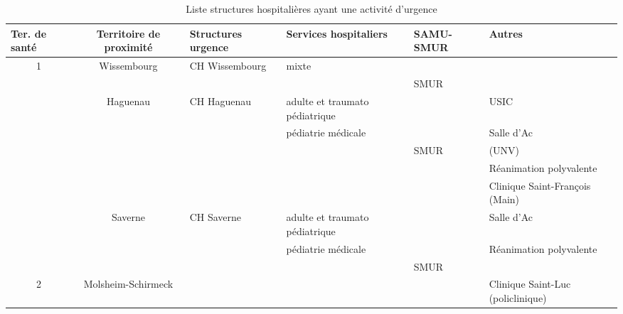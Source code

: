 \documentclass[a4paper,8pt]{article}
\title{}
\author{}
\begin{document}
\maketitle

\section{}

\begin{table}[htbp]
\caption{Liste structures hospitalières ayant une activité d'urgence}
\begin{turn}{90}
\begin{tabular}{|l|c|l|l|l|l|}
\hline
\textbf{Ter. de santé} & \textbf{Territoire de proximité} & \textbf{Structures urgence} & \textbf{Services hospitaliers} & \textbf{SAMU-SMUR} & \textbf{Autres} \\ \hline
\multicolumn{ 1}{|c|}{1} & \multicolumn{ 1}{c|}{Wissembourg} & \multicolumn{ 1}{l|}{CH Wissembourg} & mixte &  &  \\ \cline{ 4- 6}
\multicolumn{ 1}{|l|}{} & \multicolumn{ 1}{c|}{} & \multicolumn{ 1}{l|}{} &  & SMUR &  \\ \cline{ 2- 6}
\multicolumn{ 1}{|l|}{} & \multicolumn{ 1}{c|}{Haguenau} & \multicolumn{ 1}{l|}{CH Haguenau} & adulte et traumato pédiatrique &  & USIC \\ \cline{ 4- 6}
\multicolumn{ 1}{|l|}{} & \multicolumn{ 1}{c|}{} & \multicolumn{ 1}{l|}{} & pédiatrie médicale &  & Salle d'Ac \\ \cline{ 4- 6}
\multicolumn{ 1}{|l|}{} & \multicolumn{ 1}{c|}{} & \multicolumn{ 1}{l|}{} &  & SMUR & (UNV) \\ \cline{ 4- 6}
\multicolumn{ 1}{|l|}{} & \multicolumn{ 1}{c|}{} & \multicolumn{ 1}{l|}{} &  &  & Réanimation polyvalente \\ \cline{ 3- 6}
\multicolumn{ 1}{|l|}{} & \multicolumn{ 1}{c|}{} &  &  &  & Clinique Saint-François (Main) \\ \cline{ 2- 6}
\multicolumn{ 1}{|l|}{} & \multicolumn{ 1}{c|}{Saverne} & \multicolumn{ 1}{l|}{CH Saverne} & adulte et traumato pédiatrique &  & Salle d'Ac \\ \cline{ 4- 6}
\multicolumn{ 1}{|l|}{} & \multicolumn{ 1}{c|}{} & \multicolumn{ 1}{l|}{} & pédiatrie médicale &  & Réanimation polyvalente \\ \cline{ 4- 6}
\multicolumn{ 1}{|l|}{} & \multicolumn{ 1}{c|}{} & \multicolumn{ 1}{l|}{} &  & SMUR &  \\ \hline
\multicolumn{ 1}{|c|}{2} & Molsheim-Schirmeck &  &  &  & Clinique Saint-Luc (policlinique) \\ \cline{ 2- 6}

\end{tabular}
\end{turn}
\end{table}
\end{document}
